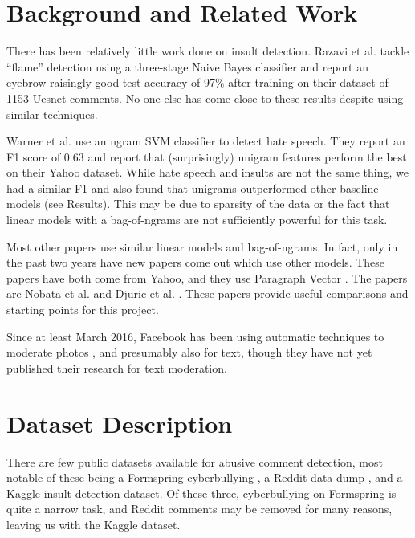 \documentclass{article} %
\begin{document}
\section*{Background and Related Work}
There has been relatively little work done on insult detection. Razavi et al. \cite{Razavi2010} tackle ``flame'' detection using a three-stage Naive Bayes classifier and report an eyebrow-raisingly good test accuracy of 97\% after training on their dataset of 1153 Uesnet comments. No one else has come close to these results despite using similar techniques.

Warner et al. \cite{warner2012detecting} use an ngram SVM classifier to detect hate speech. They report an F1 score of 0.63 and report that (surprisingly) unigram features perform the best on their Yahoo dataset. While hate speech and insults are not the same thing, we had a similar F1 and also found that unigrams outperformed other baseline models (see Results). This may be due to sparsity of the data or the fact that linear models with a bag-of-ngrams are not sufficiently powerful for this task. 

Most other papers \cite{goyal2013peer} \cite{nahar2013effective} \cite{reynolds2011using} \cite{Kontostathis:2013:DCQ:2464464.2464499} \cite{DBLP:conf/www/NobataTTMC16} \cite{chen2012detecting} use similar linear models and bag-of-ngrams. In fact, only in the past two years have new papers come out which use other models. These papers have both come from Yahoo, and they use Paragraph Vector \cite{le2014distributed}. The papers are Nobata et al.\cite{DBLP:conf/www/NobataTTMC16} and Djuric et al. \cite{Djuric:2015:HSD:2740908.2742760}. These papers provide useful comparisons and starting points for this project. 

Since at least March 2016, Facebook has been using automatic techniques to moderate photos \cite{techcrunch-facebook}, and presumably also for text, though they have not yet published their research for text moderation.


\section*{Dataset Description}
There are few public datasets available for abusive comment detection, most notable of these being a Formspring cyberbullying \cite{formspring-data}, a Reddit data dump \cite{reddit-data}, and a Kaggle insult detection \cite{kaggle-data} dataset. Of these three, cyberbullying on Formspring is quite a narrow task, and Reddit comments may be removed for many reasons, leaving us with the Kaggle dataset.  
\end{document}
